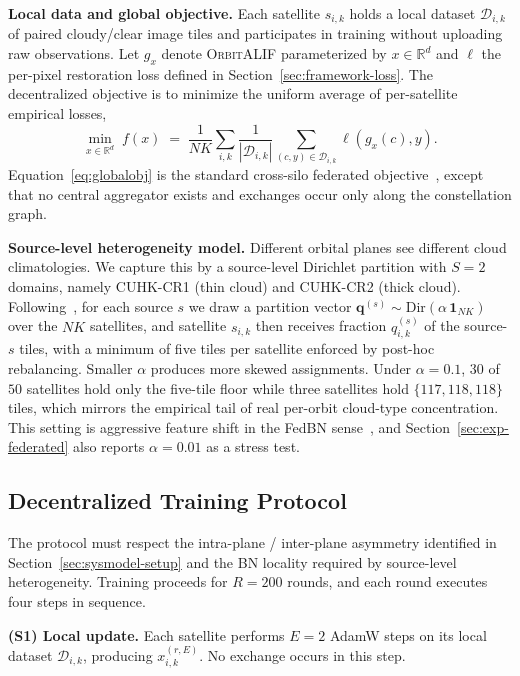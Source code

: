 \documentclass[conference]{IEEEtran}
\newcommand{\Dir}{\mathrm{Dir}}
\newcommand{\OrbitALIF}{\textsc{OrbitALIF}}
\begin{document}
\textbf{Local data and global objective.} Each satellite $s_{i,k}$
holds a local dataset $\mathcal{D}_{i,k}$ of paired cloudy/clear
image tiles and participates in training without uploading raw
observations. Let $g_x$ denote \OrbitALIF{} parameterized by
$x\!\in\!\mathbb{R}^d$ and $\ell$ the per-pixel restoration loss
defined in Section~\ref{sec:framework-loss}. The decentralized
objective is to minimize the uniform average of per-satellite
empirical losses,
\begin{equation}
\min_{x \in \mathbb{R}^d}\;
f(x)
\;=\;
\frac{1}{NK}\sum_{i,k}
\frac{1}{|\mathcal{D}_{i,k}|}
\!\!\sum_{(c,y)\in\mathcal{D}_{i,k}}\!\!
\ell\!\left(g_x(c),y\right).
\label{eq:globalobj}
\end{equation}
Equation~\eqref{eq:globalobj} is the standard cross-silo federated
objective~\cite{ref:fedavg}, except that no central aggregator
exists and exchanges occur only along the constellation graph.

\textbf{Source-level heterogeneity model.} Different orbital planes
see different cloud climatologies. We capture this by a
source-level Dirichlet partition with $S\!=\!2$ domains, namely
CUHK-CR1 (thin cloud) and CUHK-CR2 (thick cloud).
Following~\cite{ref:hsu2019}, for each source $s$ we draw a
partition vector
$\mathbf{q}^{(s)}\!\sim\!\Dir(\alpha\,\mathbf{1}_{NK})$ over the
$NK$ satellites, and satellite $s_{i,k}$ then receives fraction
$q^{(s)}_{i,k}$ of the source-$s$ tiles, with a minimum of five
tiles per satellite enforced by post-hoc rebalancing. Smaller
$\alpha$ produces more skewed assignments. Under $\alpha\!=\!0.1$,
$30$ of $50$ satellites hold only the five-tile floor while three
satellites hold $\{117,118,118\}$ tiles, which mirrors the empirical
tail of real per-orbit cloud-type concentration. This setting is
aggressive feature shift in the FedBN sense~\cite{ref:fedbn}, and
Section~\ref{sec:exp-federated} also reports $\alpha\!=\!0.01$ as a
stress test.

\subsection{Decentralized Training Protocol}\label{sec:sysmodel-procedure}

The protocol must respect the intra-plane / inter-plane asymmetry
identified in Section~\ref{sec:sysmodel-setup} and the BN locality
required by source-level heterogeneity. Training proceeds for
$R\!=\!200$ rounds, and each round executes four steps in sequence.

\textbf{(S1) Local update.} Each satellite performs $E\!=\!2$
AdamW steps on its local dataset $\mathcal{D}_{i,k}$, producing
$x_{i,k}^{(r,E)}$. No exchange occurs in this step.
\end{document}
